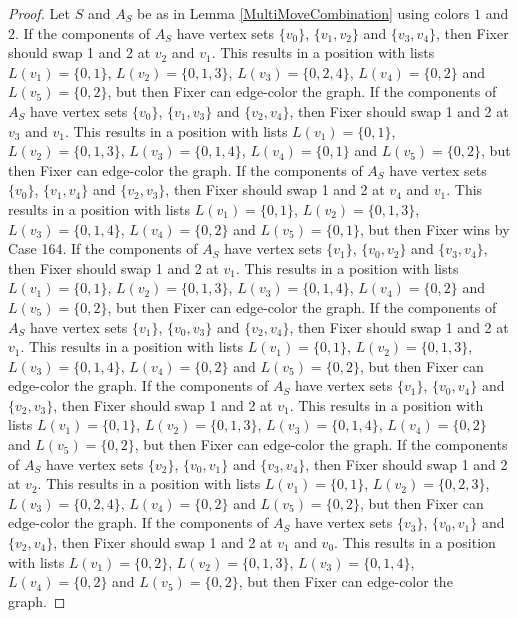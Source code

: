 \documentclass[12pt]{amsart}
\theoremstyle{plain}
\theoremstyle{definition}
\theoremstyle{remark}
\begin{document}
\begin{proof}
Let $S$ and $A_S$ be as in Lemma \ref{MultiMoveCombination} using colors $1$ and $2$. If the components of $A_S$ have vertex sets $\{v_0\}$, $\{v_1, v_2\}$ and $\{v_3, v_4\}$, then Fixer should swap 1 and 2 at $v_2$ and $v_1$. This results in a position with lists $L(v_1) = \{0, 1\}$, $L(v_2) = \{0, 1, 3\}$, $L(v_3) = \{0, 2, 4\}$, $L(v_4) = \{0, 2\}$ and $L(v_5) = \{0, 2\}$, but then Fixer can edge-color the graph.
If the components of $A_S$ have vertex sets $\{v_0\}$, $\{v_1, v_3\}$ and $\{v_2, v_4\}$, then Fixer should swap 1 and 2 at $v_3$ and $v_1$. This results in a position with lists $L(v_1) = \{0, 1\}$, $L(v_2) = \{0, 1, 3\}$, $L(v_3) = \{0, 1, 4\}$, $L(v_4) = \{0, 1\}$ and $L(v_5) = \{0, 2\}$, but then Fixer can edge-color the graph.
If the components of $A_S$ have vertex sets $\{v_0\}$, $\{v_1, v_4\}$ and $\{v_2, v_3\}$, then Fixer should swap 1 and 2 at $v_4$ and $v_1$. This results in a position with lists $L(v_1) = \{0, 1\}$, $L(v_2) = \{0, 1, 3\}$, $L(v_3) = \{0, 1, 4\}$, $L(v_4) = \{0, 2\}$ and $L(v_5) = \{0, 1\}$, but then Fixer wins by Case 164.
If the components of $A_S$ have vertex sets $\{v_1\}$, $\{v_0, v_2\}$ and $\{v_3, v_4\}$, then Fixer should swap 1 and 2 at $v_1$. This results in a position with lists $L(v_1) = \{0, 1\}$, $L(v_2) = \{0, 1, 3\}$, $L(v_3) = \{0, 1, 4\}$, $L(v_4) = \{0, 2\}$ and $L(v_5) = \{0, 2\}$, but then Fixer can edge-color the graph.
If the components of $A_S$ have vertex sets $\{v_1\}$, $\{v_0, v_3\}$ and $\{v_2, v_4\}$, then Fixer should swap 1 and 2 at $v_1$. This results in a position with lists $L(v_1) = \{0, 1\}$, $L(v_2) = \{0, 1, 3\}$, $L(v_3) = \{0, 1, 4\}$, $L(v_4) = \{0, 2\}$ and $L(v_5) = \{0, 2\}$, but then Fixer can edge-color the graph.
If the components of $A_S$ have vertex sets $\{v_1\}$, $\{v_0, v_4\}$ and $\{v_2, v_3\}$, then Fixer should swap 1 and 2 at $v_1$. This results in a position with lists $L(v_1) = \{0, 1\}$, $L(v_2) = \{0, 1, 3\}$, $L(v_3) = \{0, 1, 4\}$, $L(v_4) = \{0, 2\}$ and $L(v_5) = \{0, 2\}$, but then Fixer can edge-color the graph.
If the components of $A_S$ have vertex sets $\{v_2\}$, $\{v_0, v_1\}$ and $\{v_3, v_4\}$, then Fixer should swap 1 and 2 at $v_2$. This results in a position with lists $L(v_1) = \{0, 1\}$, $L(v_2) = \{0, 2, 3\}$, $L(v_3) = \{0, 2, 4\}$, $L(v_4) = \{0, 2\}$ and $L(v_5) = \{0, 2\}$, but then Fixer can edge-color the graph.
If the components of $A_S$ have vertex sets $\{v_3\}$, $\{v_0, v_1\}$ and $\{v_2, v_4\}$, then Fixer should swap 1 and 2 at $v_1$ and $v_0$. This results in a position with lists $L(v_1) = \{0, 2\}$, $L(v_2) = \{0, 1, 3\}$, $L(v_3) = \{0, 1, 4\}$, $L(v_4) = \{0, 2\}$ and $L(v_5) = \{0, 2\}$, but then Fixer can edge-color the graph.

\end{proof}
\end{document}
